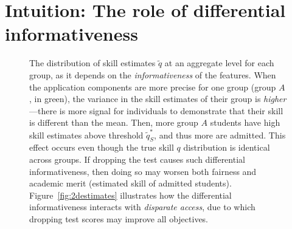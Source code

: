 \section{Intuition: The role of differential informativeness}
\label{sec:estimatesintuition}


\begin{figure}
	\centering
	\caption{The distribution of skill estimates $\tilde q$ at an aggregate level for each group, as it depends on the \textit{informativeness} of the features. When the application components are more precise for one group (group $A$, in green), the variance in the skill estimates of their group is \textit{higher}---there is more signal for individuals to demonstrate that their skill is different than the mean. Then, more group $A$ students have high skill estimates above threshold $\tilde q^*_S$, and thus more are admitted. This effect occurs even though the true skill $q$ distribution is identical across groups. If dropping the test causes such differential informativeness, then doing so may worsen both fairness and academic merit (estimated skill of admitted students). Figure~\ref{fig:2destimates} illustrates how the differential informativeness interacts with \textit{disparate access}, due to which dropping test scores may improve all objectives.
}
	\label{fig:normals_intuition}
\end{figure}




